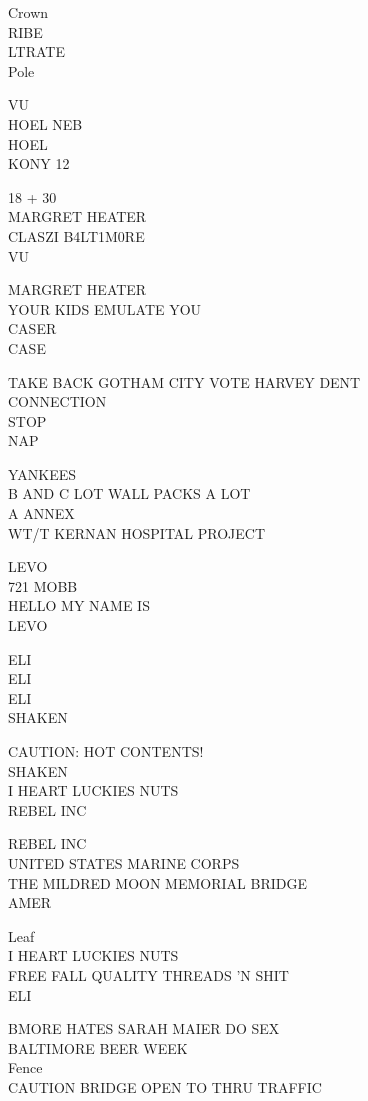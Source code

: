 \documentclass[10pt,letterpaper]{article}
\begin{document}
Crown\\
RIBE\\
LTRATE\\
Pole

VU\\
HOEL NEB\\
HOEL\\
KONY 12

18 + 30\\
MARGRET HEATER\\
CLASZI B4LT1M0RE\\
VU

MARGRET HEATER\\
YOUR KIDS EMULATE YOU\\
CASER\\
CASE

TAKE BACK GOTHAM CITY VOTE HARVEY DENT\\
CONNECTION\\
STOP\\
NAP

YANKEES\\
B AND C LOT WALL PACKS A LOT\\
A ANNEX\\
WT/T KERNAN HOSPITAL PROJECT

LEVO\\
721 MOBB\\
HELLO MY NAME IS\\
LEVO

ELI\\
ELI\\
ELI\\
SHAKEN

CAUTION: HOT CONTENTS!\\
SHAKEN\\
I HEART LUCKIES NUTS\\
REBEL INC

REBEL INC\\
UNITED STATES MARINE CORPS\\
THE MILDRED MOON MEMORIAL BRIDGE\\
AMER

Leaf\\
I HEART LUCKIES NUTS\\
FREE FALL QUALITY THREADS 'N SHIT\\
ELI

BMORE HATES SARAH MAIER DO SEX\\
BALTIMORE BEER WEEK\\
Fence\\
CAUTION BRIDGE OPEN TO THRU TRAFFIC
\end{document}

